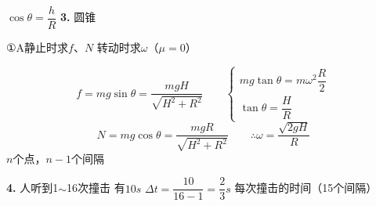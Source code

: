 $\cos\theta=\dfrac{h}{R}$
\textbf{3.} 圆锥

①A静止时求$f$、$N$ \quad 转动时求$\omega$（$\mu=0$）

\[ f=mg\sin\theta=\frac{mgH}{\sqrt{H^{2}+R^{2}}}\qquad
\begin{cases} mg\tan\theta=m\omega^{2}\dfrac{R}{2}\\[4pt] \tan\theta=\dfrac{H}{R}\end{cases} \]
\[ N=mg\cos\theta=\frac{mgR}{\sqrt{H^{2}+R^{2}}}\qquad \therefore\omega=\frac{\sqrt{2gH}}{R} \]
$n$个点，$n-1$个间隔

\textbf{4.} 人听到1$\sim$16次撞击 有$10\unit{s}$ \qquad $\Delta t=\dfrac{10}{16-1}=\dfrac{2}{3}\unit{s}$ 每次撞击的时间（15个间隔）

